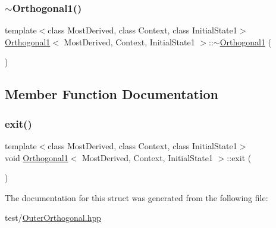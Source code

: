 \mbox{\label{struct_orthogonal1_ae085dfe6ebfd6616166973e0f4338d6a}} 
\subsubsection{\texorpdfstring{$\sim$\+Orthogonal1()}{~Orthogonal1()}}
{\footnotesize\ttfamily template$<$class Most\+Derived, class Context, class Initial\+State1$>$ \\
\mbox{\hyperlink{struct_orthogonal1}{Orthogonal1}}$<$ Most\+Derived, Context, Initial\+State1 $>$\+::$\sim$\mbox{\hyperlink{struct_orthogonal1}{Orthogonal1}} (\begin{DoxyParamCaption}{ }\end{DoxyParamCaption})\hspace{0.3cm}{\ttfamily [inline]}}



\subsection{Member Function Documentation}
\mbox{\label{struct_orthogonal1_adaf5bf49d76b33cc8f1e5a2e707626a7}} 
\subsubsection{\texorpdfstring{exit()}{exit()}}
{\footnotesize\ttfamily template$<$class Most\+Derived, class Context, class Initial\+State1$>$ \\
void \mbox{\hyperlink{struct_orthogonal1}{Orthogonal1}}$<$ Most\+Derived, Context, Initial\+State1 $>$\+::exit (\begin{DoxyParamCaption}{ }\end{DoxyParamCaption})\hspace{0.3cm}{\ttfamily [inline]}}



The documentation for this struct was generated from the following file\+:\begin{DoxyCompactItemize}
\item 
test/\mbox{\hyperlink{_outer_orthogonal_8hpp}{Outer\+Orthogonal.\+hpp}}\end{DoxyCompactItemize}
